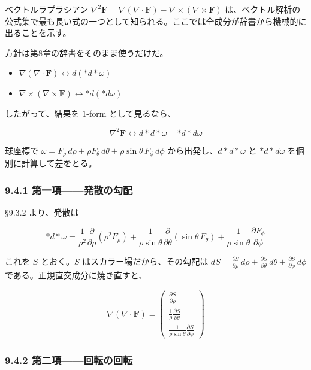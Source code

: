 \documentclass[a4paper,12pt,openany]{book}
\begin{document}
ベクトルラプラシアン
\(\nabla^2\mathbf{F} = \nabla(\nabla\cdot\mathbf{F}) - \nabla\times(\nabla\times\mathbf{F})\)
は、ベクトル解析の公式集で最も長い式の一つとして知られる。ここでは全成分が辞書から機械的に出ることを示す。

方針は第8章の辞書をそのまま使うだけだ。

\begin{itemize}
\item
  \(\nabla(\nabla\cdot\mathbf{F}) \leftrightarrow d(\ast d\ast\omega)\)
\item
  \(\nabla\times(\nabla\times\mathbf{F}) \leftrightarrow \ast d(\ast d\omega)\)
\end{itemize}

したがって、結果を \(1\)-form として見るなら、

\[\nabla^2\mathbf{F} \leftrightarrow d\ast d\ast\omega - \ast d\ast d\omega\]

球座標で
\(\omega = F_\rho\,d\rho + \rho F_\theta\,d\theta + \rho\sin\theta\,F_\phi\,d\phi\)
から出発し、\(d\ast d\ast\omega\) と \(\ast d\ast d\omega\)
を個別に計算して差をとる。

\hypertarget{ux7b2cux4e00ux9805ux767aux6563ux306eux52feux914d}{%
\subsubsection{9.4.1
第一項——発散の勾配}\label{ux7b2cux4e00ux9805ux767aux6563ux306eux52feux914d}}

§9.3.2 より、発散は

\[\ast d\ast\omega = \frac{1}{\rho^2}\frac{\partial}{\partial\rho}(\rho^2 F_\rho) + \frac{1}{\rho\sin\theta}\frac{\partial}{\partial\theta}(\sin\theta\,F_\theta) + \frac{1}{\rho\sin\theta}\frac{\partial F_\phi}{\partial\phi}\]

これを \(S\) とおく。\(S\) はスカラー場だから、その勾配は
\(dS = \frac{\partial S}{\partial\rho}\,d\rho + \frac{\partial S}{\partial\theta}\,d\theta + \frac{\partial S}{\partial\phi}\,d\phi\)
である。正規直交成分に焼き直すと、

\[\nabla(\nabla\cdot\mathbf{F}) = \begin{pmatrix}
\frac{\partial S}{\partial\rho} \\[0.5em]
\frac{1}{\rho}\frac{\partial S}{\partial\theta} \\[0.5em]
\frac{1}{\rho\sin\theta}\frac{\partial S}{\partial\phi}
\end{pmatrix}\]

\hypertarget{ux7b2cux4e8cux9805ux56deux8ee2ux306eux56deux8ee2}{%
\subsubsection{9.4.2
第二項——回転の回転}\label{ux7b2cux4e8cux9805ux56deux8ee2ux306eux56deux8ee2}}
\end{document}
